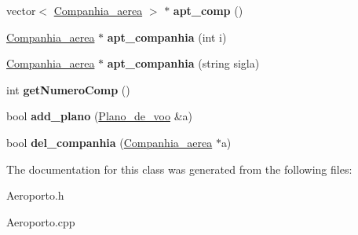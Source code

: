 \begin{DoxyCompactItemize}
\item 
\hypertarget{classstd_1_1_aeroporto_aecf2317211d227f5e6bff0da59fe7898}{
vector$<$ \hyperlink{class_companhia__aerea}{Companhia\_\-aerea} $>$ $\ast$ {\bfseries apt\_\-comp} ()}
\label{classstd_1_1_aeroporto_aecf2317211d227f5e6bff0da59fe7898}

\item 
\hypertarget{classstd_1_1_aeroporto_a7f60c668d6ac2217aa3f57cba9d56de5}{
\hyperlink{class_companhia__aerea}{Companhia\_\-aerea} $\ast$ {\bfseries apt\_\-companhia} (int i)}
\label{classstd_1_1_aeroporto_a7f60c668d6ac2217aa3f57cba9d56de5}

\item 
\hypertarget{classstd_1_1_aeroporto_a7db9b53a0fb24e885412c4869deea329}{
\hyperlink{class_companhia__aerea}{Companhia\_\-aerea} $\ast$ {\bfseries apt\_\-companhia} (string sigla)}
\label{classstd_1_1_aeroporto_a7db9b53a0fb24e885412c4869deea329}

\item 
\hypertarget{classstd_1_1_aeroporto_acb3371627cbb8189fba7c7b96886f69a}{
int {\bfseries getNumeroComp} ()}
\label{classstd_1_1_aeroporto_acb3371627cbb8189fba7c7b96886f69a}

\item 
\hypertarget{classstd_1_1_aeroporto_af7318ed305e22001a3b97e6762acde8b}{
bool {\bfseries add\_\-plano} (\hyperlink{class_plano__de__voo}{Plano\_\-de\_\-voo} \&a)}
\label{classstd_1_1_aeroporto_af7318ed305e22001a3b97e6762acde8b}

\item 
\hypertarget{classstd_1_1_aeroporto_aaa252bcad1a37285abdeb7e073f08556}{
bool {\bfseries del\_\-companhia} (\hyperlink{class_companhia__aerea}{Companhia\_\-aerea} $\ast$a)}
\label{classstd_1_1_aeroporto_aaa252bcad1a37285abdeb7e073f08556}

\end{DoxyCompactItemize}


The documentation for this class was generated from the following files:\begin{DoxyCompactItemize}
\item 
Aeroporto.h\item 
Aeroporto.cpp\end{DoxyCompactItemize}
